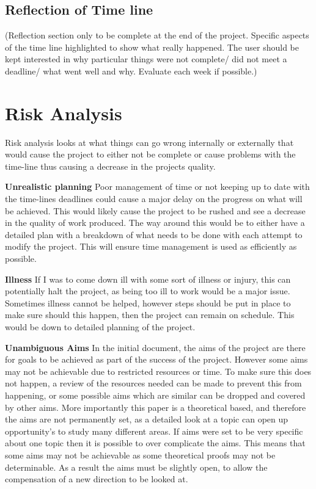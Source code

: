 \documentclass[11pt,a4paper]{report}
\begin{document}
\subsection{Reflection of Time line}
(Reflection section only to be complete at the end of the project. Specific aspects of the time line highlighted to show what really happened. The user should be kept interested in why particular things were not complete/ did not meet a deadline/ what went well and why. Evaluate each week if possible.)

\section{Risk Analysis}
Risk analysis looks at what things can go wrong internally or externally that would cause the project to either not be complete or cause problems with the time-line thus causing a decrease in the projects quality.


\textbf{Unrealistic planning}
Poor management of time or not keeping up to date with the time-lines deadlines could cause a major delay on the progress on what will be achieved. This would likely cause the project to be rushed and see a decrease in the quality of work produced. The way around this would be to either have a detailed plan with a breakdown of what needs to be done with each attempt to modify the project. This will ensure time management is used as efficiently as possible.

\textbf{Illness}
If I was to come down ill with some sort of illness or injury, this can potentially halt the project, as being too ill to work would be a major issue. Sometimes illness cannot be helped, however steps should be put in place to make sure should this happen, then the project can remain on schedule. This would be down to detailed planning of the project.


\textbf{Unambiguous Aims}
In the initial document, the aims of the project are there for goals to be achieved as part of the success of the project. However some aims may not be achievable due to restricted resources or time.
To make sure this does not happen, a review of the resources needed can be made to prevent this from happening, or some possible aims which are similar can be dropped and covered by other aims. More importantly this paper is a theoretical based, and therefore the aims are not permanently set, as a detailed look at a topic can open up opportunity's to study many different areas. If aims were set to be very specific about one topic then it is possible to over complicate the aims. This means that some aims may not be achievable as some theoretical proofs may not be determinable. As a result the aims must be slightly open, to allow the compensation of a new direction to be looked at.
\end{document}
